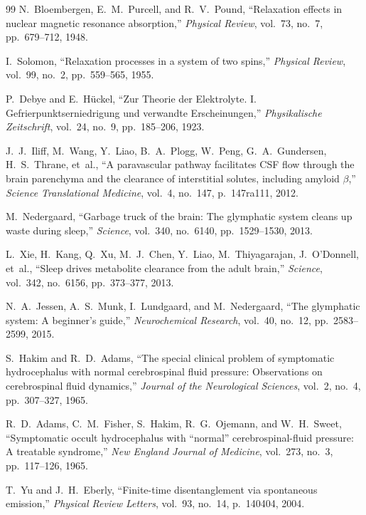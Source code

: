 \documentclass[10pt,twocolumn,3p]{article}
\begin{document}
\begin{thebibliography}{99}
N.~Bloembergen, E.~M.~Purcell, and R.~V.~Pound,
``Relaxation effects in nuclear magnetic resonance absorption,''
\textit{Physical Review}, vol.~73, no.~7, pp.~679--712, 1948.

I.~Solomon,
``Relaxation processes in a system of two spins,''
\textit{Physical Review}, vol.~99, no.~2, pp.~559--565, 1955.

P.~Debye and E.~H\"uckel,
``Zur Theorie der Elektrolyte. I. Gefrierpunktserniedrigung und verwandte Erscheinungen,''
\textit{Physikalische Zeitschrift}, vol.~24, no.~9, pp.~185--206, 1923.

J.~J.~Iliff, M.~Wang, Y.~Liao, B.~A.~Plogg, W.~Peng, G.~A.~Gundersen, H.~S.~Thrane, et~al.,
``A paravascular pathway facilitates CSF flow through the brain parenchyma and the clearance of interstitial solutes, including amyloid $\beta$,''
\textit{Science Translational Medicine}, vol.~4, no.~147, p.~147ra111, 2012.

M.~Nedergaard,
``Garbage truck of the brain: The glymphatic system cleans up waste during sleep,''
\textit{Science}, vol.~340, no.~6140, pp.~1529--1530, 2013.

L.~Xie, H.~Kang, Q.~Xu, M.~J.~Chen, Y.~Liao, M.~Thiyagarajan, J.~O'Donnell, et~al.,
``Sleep drives metabolite clearance from the adult brain,''
\textit{Science}, vol.~342, no.~6156, pp.~373--377, 2013.

N.~A.~Jessen, A.~S.~Munk, I.~Lundgaard, and M.~Nedergaard,
``The glymphatic system: A beginner's guide,''
\textit{Neurochemical Research}, vol.~40, no.~12, pp.~2583--2599, 2015.

S.~Hakim and R.~D.~Adams,
``The special clinical problem of symptomatic hydrocephalus with normal cerebrospinal fluid pressure: Observations on cerebrospinal fluid dynamics,''
\textit{Journal of the Neurological Sciences}, vol.~2, no.~4, pp.~307--327, 1965.

R.~D.~Adams, C.~M.~Fisher, S.~Hakim, R.~G.~Ojemann, and W.~H.~Sweet,
``Symptomatic occult hydrocephalus with ``normal'' cerebrospinal-fluid pressure: A treatable syndrome,''
\textit{New England Journal of Medicine}, vol.~273, no.~3, pp.~117--126, 1965.

T.~Yu and J.~H.~Eberly,
``Finite-time disentanglement via spontaneous emission,''
\textit{Physical Review Letters}, vol.~93, no.~14, p.~140404, 2004.


\end{thebibliography}
\end{document}
